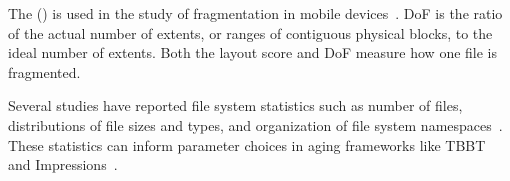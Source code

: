 The  () is used in the study of
fragmentation in mobile devices~\cite{DBLP:conf/hotstorage/JiCSWLX16}. DoF is
the ratio of the actual number of extents, or ranges of contiguous physical
blocks, to the ideal number of extents.  Both the layout score and DoF measure
how one file is fragmented.

Several studies have reported file system statistics such as number of files,
distributions of file sizes and types, and organization of file system
namespaces~\cite{DBLP:journals/tos/AgrawalBDL07,DBLP:conf/mascots/Downey01,DBLP:conf/usenix/RoselliLA00}.
These statistics can inform parameter choices in aging frameworks like TBBT and
Impressions~\cite{DBLP:conf/fast/ZhuCC05,DBLP:journals/tos/AgrawalAA09}.
